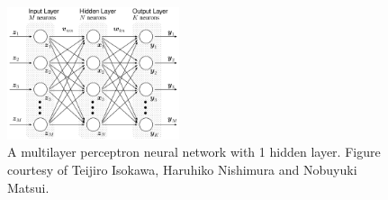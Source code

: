 \begin{figure}[h]
    \centering
    \includegraphics[width=0.45\textwidth]{figures/multilayer_perceptron.png}
    \caption{A multilayer perceptron neural network with 1 hidden layer.
        Figure courtesy of Teijiro Isokawa, Haruhiko Nishimura and Nobuyuki Matsui.}
    \label{Fig:MLPArchitecture}
\end{figure}

